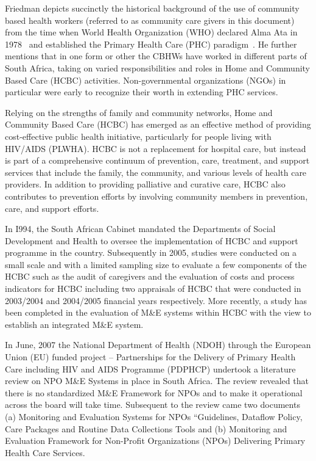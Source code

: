 Friedman depicts succinctly the historical background of the 
use of community based health workers (referred to as community 
care givers in this document) from the time when World Health 
Organization (WHO) declared Alma Ata in 1978~\cite{WHO1978_Alma_Ata} 
and established the Primary Health Care (PHC) 
paradigm~\cite{Friedman2002_CHWs}. He further mentions that in one form 
or other the CBHWs have worked in different parts of South Africa, taking 
on varied responsibilities and roles in Home and Community Based 
Care (HCBC) activities. Non-governmental organizations (NGOs) in 
particular were early to recognize their worth in extending PHC services.  

Relying on the strengths of family and community networks, 
Home and Community Based Care (HCBC) has emerged as an effective 
method of providing cost-effective public health initiative, 
particularly for people living with HIV/AIDS 
(PLWHA). HCBC is not a replacement for hospital 
care, but instead is part of a comprehensive continuum of prevention, 
care, treatment, and support services that include the family, the 
community, and various levels of health care providers. In addition to 
providing palliative and curative care, HCBC also 
contributes to prevention efforts by involving community members in 
prevention, care, and support efforts.

In I994, the South African Cabinet mandated the Departments of Social
Development and Health to oversee the implementation of HCBC and
support programme in the country. Subsequently in 2005, studies were
conducted on a small scale and with a limited sampling size to
evaluate a few components of the HCBC such as the audit of caregivers
and the evaluation of costs and process indicators for HCBC including
two appraisals of HCBC that were conducted in 2003/2004 and 2004/2005
financial years respectively. More recently, a study has been
completed in the evaluation of M\&E systems within HCBC with the view
to establish an integrated M\&E system.

In June, 2007 the National Department of Health (NDOH) through the
European Union (EU) funded project – Partnerships for the Delivery of
Primary Health Care including HIV and AIDS Programme (PDPHCP)
undertook a literature review on NPO M\&E Systems in place in South
Africa. The review revealed that there is no standardized M\&E
Framework for NPOs and to make it operational across the board will
take time. Subsequent to the review came two documents (a) Monitoring
and Evaluation Systems for NPOs “Guidelines, Dataflow Policy, Care
Packages and Routine Data Collections Tools and (b) Monitoring and
Evaluation Framework for Non-Profit Organizations (NPOs) Delivering
Primary Health Care Services. 

